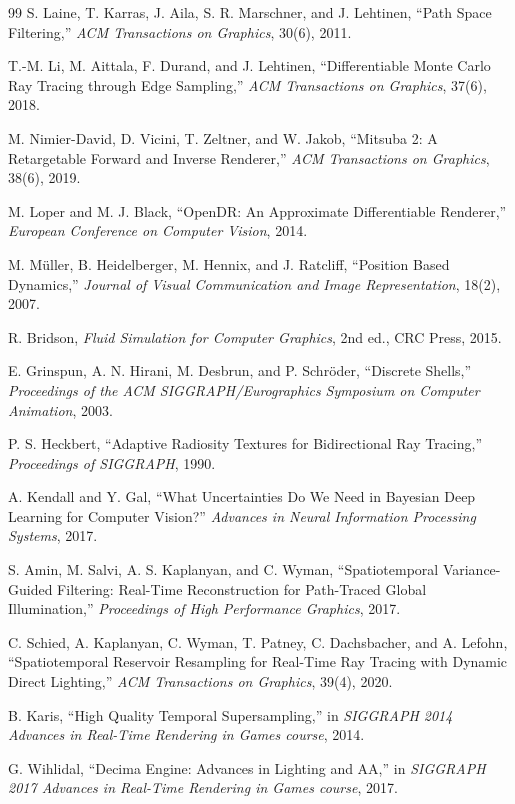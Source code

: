 \documentclass[11pt]{article}
\theoremstyle{definition}
\theoremstyle{plain}
\begin{document}
\begin{thebibliography}{99}
S. Laine, T. Karras, J. Aila, S. R. Marschner, and J. Lehtinen,
``Path Space Filtering,''
\emph{ACM Transactions on Graphics}, 30(6), 2011.

T.-M. Li, M. Aittala, F. Durand, and J. Lehtinen,
``Differentiable Monte Carlo Ray Tracing through Edge Sampling,''
\emph{ACM Transactions on Graphics}, 37(6), 2018.

M. Nimier-David, D. Vicini, T. Zeltner, and W. Jakob,
``Mitsuba 2: A Retargetable Forward and Inverse Renderer,''
\emph{ACM Transactions on Graphics}, 38(6), 2019.

M. Loper and M. J. Black,
``OpenDR: An Approximate Differentiable Renderer,''
\emph{European Conference on Computer Vision}, 2014.

M. M\"uller, B. Heidelberger, M. Hennix, and J. Ratcliff,
``Position Based Dynamics,''
\emph{Journal of Visual Communication and Image Representation}, 18(2), 2007.

R. Bridson,
\emph{Fluid Simulation for Computer Graphics},
2nd ed., CRC Press, 2015.

E. Grinspun, A. N. Hirani, M. Desbrun, and P. Schr\"oder,
``Discrete Shells,''
\emph{Proceedings of the ACM SIGGRAPH/Eurographics Symposium on Computer Animation}, 2003.

P. S. Heckbert,
``Adaptive Radiosity Textures for Bidirectional Ray Tracing,''
\emph{Proceedings of SIGGRAPH}, 1990.

A. Kendall and Y. Gal,
``What Uncertainties Do We Need in Bayesian Deep Learning for Computer Vision?''
\emph{Advances in Neural Information Processing Systems}, 2017.

S. Amin, M. Salvi, A. S. Kaplanyan, and C. Wyman,
``Spatiotemporal Variance-Guided Filtering: Real-Time Reconstruction for Path-Traced Global Illumination,''
\emph{Proceedings of High Performance Graphics}, 2017.

C. Schied, A. Kaplanyan, C. Wyman, T. Patney, C. Dachsbacher, and A. Lefohn,
``Spatiotemporal Reservoir Resampling for Real-Time Ray Tracing with Dynamic Direct Lighting,''
\emph{ACM Transactions on Graphics}, 39(4), 2020.

B. Karis,
``High Quality Temporal Supersampling,''
in \emph{SIGGRAPH 2014 Advances in Real-Time Rendering in Games course}, 2014.

G. Wihlidal,
``Decima Engine: Advances in Lighting and AA,''
in \emph{SIGGRAPH 2017 Advances in Real-Time Rendering in Games course}, 2017.

\end{thebibliography}
\end{document}
